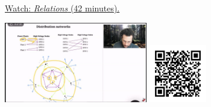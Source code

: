 
\begin{minipage}{10cm}
    \href{https://act4e-spring21.netlify.app/videos/spring2021-relations:relations.html}{Watch: \emph{Relations} (42 minutes).}
        
    \href{https://act4e-spring21.netlify.app/videos/spring2021-relations:relations.html}{\includegraphics[height=3.5cm]{spring2021-relations:relations/thumbnails.jpg}}
    \href{https://act4e-spring21.netlify.app/videos/spring2021-relations:relations.html}{\includegraphics[height=2.5cm]{spring2021-relations:relations/qrcode.png}}
\end{minipage}
